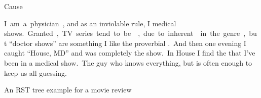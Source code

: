 {
  \small
  \centering
         {
           \dirrel{}
                  {
                           {}
                           {}
                           {}}
                  {Cause}
                  {
                           {}
                           {}
                           {}
                  }
         }
         {}
         {}

         \begin{flushleft}
           \begin{rhetoricaltext}
             \unit[1]{I am a physician,}
             \unit[2]{and as an inviolable rule, I  medical shows.}
             \unit[3]{Granted, TV series tend to be , due to inherent  in the genre,}
             \unit[4]{but ``doctor shows'' are something I  like the
               proverbial .}

             \unit[5]{And then one evening I caught ``House, MD'' and was completely  the show.}
             \unit[6]{In House I find the  that I've been  in a medical show.}
             \unit[7]{The guy who knows everything, but is  often enough to keep us all guessing.}
           \end{rhetoricaltext}
         \end{flushleft}
         \caption{An RST tree example for a movie
           review}\label{dasa:fig:rst-tree} }
